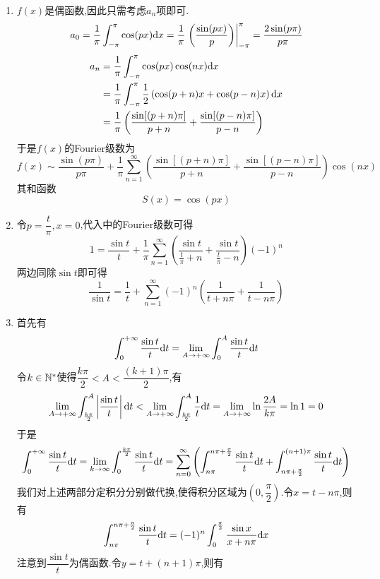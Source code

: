 \documentclass{ctexart}
\begin{document}
\begin{solution}
    \begin{enumerate}[label=\tbf{(\arabic*)},topsep=0pt,parsep=0pt,itemsep=0pt,partopsep=0pt]
        \item $f(x)$是偶函数,因此只需考虑$a_n$项即可.
            \[a_0=\dfrac{1}{\pi}\int_{-\pi}^{\pi}\cos(px)\mathrm{d} x=\dfrac{1}{\pi}\left.\left(\dfrac{\sin(px)}{p}\right)\right|_{-\pi}^{\pi}=\dfrac{2\sin(p\pi)}{p\pi}\]
            \[\begin{aligned}
                a_n
                &= \dfrac{1}{\pi}\int_{-\pi}^{\pi}\cos(px)\cos(nx)\mathrm{d} x \\
                &= \dfrac{1}{\pi}\int_{-\pi}^{\pi}\dfrac{1}{2}\left(\cos(p+n)x+\cos(p-n)x\right)\mathrm{d} x \\
                &= \dfrac{1}{\pi}\left(\dfrac{\sin[(p+n)\pi]}{p+n}+\dfrac{\sin[(p-n)\pi]}{p-n}\right)
            \end{aligned}\]
            于是$f(x)$的Fourier级数为
            \[f(x)\sim\dfrac{\sin(p\pi)}{p\pi}+\dfrac{1}{\pi}\sum_{n=1}^{\infty}\left(\dfrac{\sin[(p+n)\pi]}{p+n}+\dfrac{\sin[(p-n)\pi]}{p-n}\right)\cos(nx)\]
            其和函数
            \[S(x)=\cos(px)\]
        \item 令$p=\dfrac{t}{\pi},x=0$,代入中的Fourier级数可得
            \[1=\dfrac{\sin t}{t}+\dfrac{1}{\pi}\sum_{n=1}^{\infty}\left(\dfrac{\sin t}{\frac{t}{\pi}+n}+\dfrac{\sin t}{\frac{t}{\pi}-n}\right)(-1)^n\]
            两边同除$\sin t$即可得
            \[\dfrac{1}{\sin t}=\dfrac1t+\sum_{n=1}^{\infty}(-1)^n\left(\dfrac{1}{t+n\pi}+\dfrac{1}{t-n\pi}\right)\]
        \item 首先有
            \[\int_0^{+\infty}\dfrac{\sin t}{t}\mathrm{d} t=\lim_{A\to+\infty}\int_0^A\dfrac{\sin t}{t}\mathrm{d} t\]
            令$k\in\mathbb{N}^*$使得$\dfrac{k\pi}{2}<A<\dfrac{(k+1)\pi}{2}$,有
            \[\lim_{A\to+\infty}\int_{\frac{k\pi}{2}}^{A}\left|\dfrac{\sin t}{t}\right|\mathrm{d} t<\lim_{A\to+\infty}\int_{\frac{k\pi}{2}}^{A}\dfrac1t\mathrm{d} t=\lim_{A\to+\infty}\ln\dfrac{2A}{k\pi}=\ln 1=0\]
            于是
            \[\int_0^{+\infty}\dfrac{\sin t}{t}\mathrm{d} t=\lim_{k\to\infty}\int_0^{\frac{k\pi}{2}}\dfrac{\sin t}{t}\mathrm{d} t
            =\sum_{n=0}^{\infty}\left(\int_{n\pi}^{n\pi+\frac\pi2}\dfrac{\sin t}{t}\mathrm{d} t+\int_{n\pi+\frac\pi2}^{(n+1)\pi}\dfrac{\sin t}{t}\mathrm{d} t\right)\]
            我们对上述两部分定积分分别做代换,使得积分区域为$\left(0,\dfrac\pi2\right)$.令$x=t-n\pi$,则有
            \[\int_{n\pi}^{n\pi+\frac\pi2}\dfrac{\sin t}{t}\mathrm{d} t=(-1)^n\int_{0}^{\frac\pi2}\dfrac{\sin x}{x+n\pi}\mathrm{d} x\]
            注意到$\dfrac{\sin t}{t}$为偶函数.令$y=t+(n+1)\pi$,则有

\end{enumerate}
\end{solution}
\end{document}
